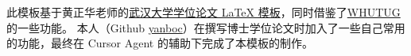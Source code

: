 此模板基于黄正华老师的\href{https://github.com/whu-thesis/whu-thesis}{武汉大学学位论文 LaTeX 模板}，同时借鉴了\href{https://github.com/whutug/whu-thesis}{WHUTUG}的一些功能。
本人（Github \@ \href{https://github.com/yanboc}{yanboc}）在撰写博士学位论文时加入了一些自己常用的功能，最终在 Cursor Agent 的辅助下完成了本模板的制作。